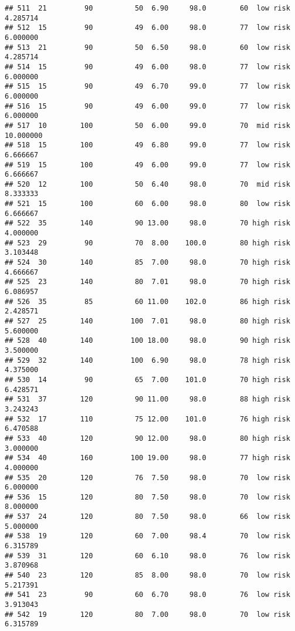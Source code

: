 \documentclass[
  ignorenonframetext,
]{beamer}
\begin{document}
\begin{frame}[fragile]
\begin{verbatim}
## 511  21         90          50  6.90     98.0        60  low risk      4.285714
## 512  15         90          49  6.00     98.0        77  low risk      6.000000
## 513  21         90          50  6.50     98.0        60  low risk      4.285714
## 514  15         90          49  6.00     98.0        77  low risk      6.000000
## 515  15         90          49  6.70     99.0        77  low risk      6.000000
## 516  15         90          49  6.00     99.0        77  low risk      6.000000
## 517  10        100          50  6.00     99.0        70  mid risk     10.000000
## 518  15        100          49  6.80     99.0        77  low risk      6.666667
## 519  15        100          49  6.00     99.0        77  low risk      6.666667
## 520  12        100          50  6.40     98.0        70  mid risk      8.333333
## 521  15        100          60  6.00     98.0        80  low risk      6.666667
## 522  35        140          90 13.00     98.0        70 high risk      4.000000
## 523  29         90          70  8.00    100.0        80 high risk      3.103448
## 524  30        140          85  7.00     98.0        70 high risk      4.666667
## 525  23        140          80  7.01     98.0        70 high risk      6.086957
## 526  35         85          60 11.00    102.0        86 high risk      2.428571
## 527  25        140         100  7.01     98.0        80 high risk      5.600000
## 528  40        140         100 18.00     98.0        90 high risk      3.500000
## 529  32        140         100  6.90     98.0        78 high risk      4.375000
## 530  14         90          65  7.00    101.0        70 high risk      6.428571
## 531  37        120          90 11.00     98.0        88 high risk      3.243243
## 532  17        110          75 12.00    101.0        76 high risk      6.470588
## 533  40        120          90 12.00     98.0        80 high risk      3.000000
## 534  40        160         100 19.00     98.0        77 high risk      4.000000
## 535  20        120          76  7.50     98.0        70  low risk      6.000000
## 536  15        120          80  7.50     98.0        70  low risk      8.000000
## 537  24        120          80  7.50     98.0        66  low risk      5.000000
## 538  19        120          60  7.00     98.4        70  low risk      6.315789
## 539  31        120          60  6.10     98.0        76  low risk      3.870968
## 540  23        120          85  8.00     98.0        70  low risk      5.217391
## 541  23         90          60  6.70     98.0        76  low risk      3.913043
## 542  19        120          80  7.00     98.0        70  low risk      6.315789

\end{verbatim}
\end{frame}
\end{document}
